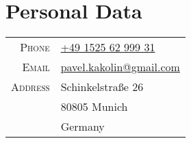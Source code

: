 \documentclass[a4paper]{article}
\begin{document}
    \pagestyle{empty}


    \section{Personal Data}
    \begin{tabular}{rl}
        \textsc{Phone}   & \href{tel:+49-1525-62-999-31}{+49 1525 62 999 31}              \\
        \textsc{Email}   & \href{mailto:pavel.kakolin@gmail.com}{pavel.kakolin@gmail.com} \\
        \textsc{Address} & Schinkelstra{\ss}e 26                                          \\
                         & 80805 Munich                                                   \\
                         & Germany                                                        \\
    \end{tabular}\bigskip
\end{document}
